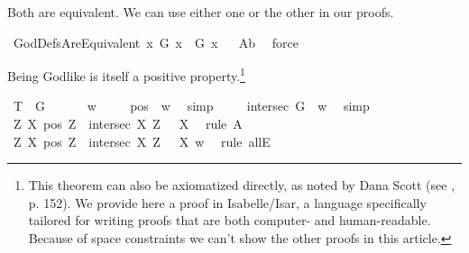 \begin{isabellebody}
\begin{isamarkuptext}%
Both are equivalent. We can use either one or the other in our proofs.%
\end{isamarkuptext}\isamarkuptrue%
\isamarkupfalse%
\ GodDefsAreEquivalent{\isacharcolon}\ {\isachardoublequoteopen}{\isasymlfloor}\isactrlbold {\isasymforall}x{\isachardot}\ G\ x\ \isactrlbold {\isasymleftrightarrow}\ G{\isacharasterisk}\ x{\isasymrfloor}{\isachardoublequoteclose}%
\ %
%
\isamarkupfalse%
\ A{}b\ \isamarkupfalse%
\ force%
%
%
%
\begin{isamarkuptext}%
Being Godlike is itself a positive property.\footnote{This theorem can also be axiomatized directly,
as noted by Dana Scott (see \cite{Fitting}, p. 152). We provide here a proof in Isabelle/Isar, a language
specifically tailored for writing proofs that are both computer- and human-readable. Because of space
constraints we can't show the other proofs in this article.}%
\end{isamarkuptext}\isamarkuptrue%
\isamarkupfalse%
\ T{}{\isacharcolon}\ {\isachardoublequoteopen}{\isasymlfloor}{\isasymP}\ G{\isasymrfloor}{\isachardoublequoteclose}%
\ %
%
\isamarkupfalse%
\ {\isacharminus}\isanewline
\isacommand{{\isacharbraceleft}}\isamarkupfalse%
\ \isamarkupfalse%
\ w\isanewline
\ \ \isamarkupfalse%
\ {}{\isacharcolon}\ {\isachardoublequoteopen}pos\ {\isasymP}\ w{\isachardoublequoteclose}\ \isamarkupfalse%
\ simp\isanewline
\ \ \isamarkupfalse%
\ {}{\isacharcolon}\ {\isachardoublequoteopen}intersec\ G\ {\isasymP}\ w{\isachardoublequoteclose}\ \isamarkupfalse%
\ simp\isanewline
\ \ \isamarkupfalse%
\ {\isachardoublequoteopen}{\isasymlfloor}\isactrlbold {\isasymforall}Z\ X{\isachardot}\ {\isacharparenleft}pos\ Z\ \isactrlbold {\isasymand}\ intersec\ X\ Z{\isacharparenright}\ \isactrlbold {\isasymrightarrow}\ {\isasymP}\ X{\isasymrfloor}{\isachardoublequoteclose}\ \isamarkupfalse%
\ {\isacharparenleft}rule\ A{}{\isacharparenright}\isanewline
\ \ \isamarkupfalse%
\ {\isachardoublequoteopen}{\isacharparenleft}\isactrlbold {\isasymforall}Z\ X{\isachardot}\ {\isacharparenleft}pos\ Z\ \isactrlbold {\isasymand}\ intersec\ X\ Z{\isacharparenright}\ \isactrlbold {\isasymrightarrow}\ {\isasymP}\ X{\isacharparenright}\ w{\isachardoublequoteclose}\ \isamarkupfalse%
\ {\isacharparenleft}rule\ allE{\isacharparenright}\isanewline

\end{isabellebody}

